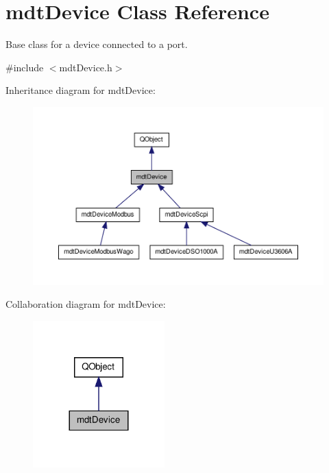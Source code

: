 \hypertarget{classmdt_device}{\section{mdt\-Device Class Reference}
\label{classmdt_device}
}


Base class for a device connected to a port.  




{\ttfamily \#include $<$mdt\-Device.\-h$>$}



Inheritance diagram for mdt\-Device\-:\nopagebreak
\begin{figure}[H]
\begin{center}
\leavevmode
\includegraphics[width=350pt]{classmdt_device__inherit__graph}
\end{center}
\end{figure}


Collaboration diagram for mdt\-Device\-:\nopagebreak
\begin{figure}[H]
\begin{center}
\leavevmode
\includegraphics[width=144pt]{classmdt_device__coll__graph}
\end{center}
\end{figure}
